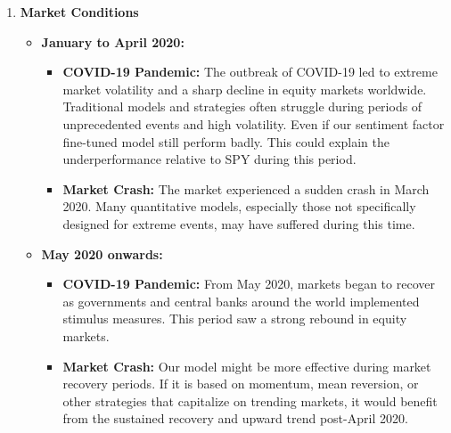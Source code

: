 \documentclass[conference]{IEEEtran}
\begin{document}
\begin{enumerate}
    \item \textbf{Market Conditions}
    \begin{itemize}
        \item \textbf{January to April 2020:}
        \begin{itemize}
            \item \textbf{COVID-19 Pandemic:} The outbreak of COVID-19 led to extreme market volatility and a sharp decline in equity markets worldwide. Traditional models and strategies often struggle during periods of unprecedented events and high volatility. Even if our sentiment factor fine-tuned model still perform badly. This could explain the underperformance relative to SPY during this period.
            \item \textbf{Market Crash:} The market experienced a sudden crash in March 2020. Many quantitative models, especially those not specifically designed for extreme events, may have suffered during this time.
        \end{itemize}
        \item \textbf{May 2020 onwards:}
        \begin{itemize}
            \item \textbf{COVID-19 Pandemic:} From May 2020, markets began to recover as governments and central banks around the world implemented stimulus measures. This period saw a strong rebound in equity markets.
            \item \textbf{Market Crash:} Our model might be more effective during market recovery periods. If it is based on momentum, mean reversion, or other strategies that capitalize on trending markets, it would benefit from the sustained recovery and upward trend post-April 2020.
        \end{itemize}
    \end{itemize}


\end{enumerate}
\end{document}
